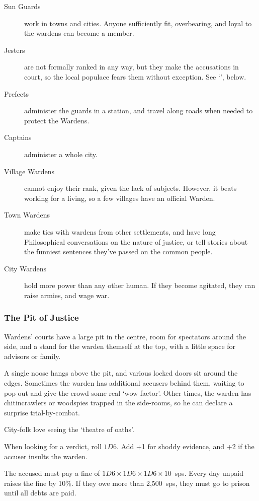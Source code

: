\begin{multicols}{2}
\begin{description}
  \item[Sun Guards]
  work in towns and cities.
  Anyone sufficiently fit, overbearing, and loyal to the wardens can become a member.
  \item[Jesters]
  are not formally ranked in any way, but they make the accusations in court, so the local populace fears them without exception.
  See `', below.
  \item[Prefects]
  administer the guards in a station, and travel along roads when needed to protect the Wardens.
  \item[Captains]
  administer a whole city.
  \item[Village Wardens]
  cannot enjoy their rank, given the lack of subjects.
  However, it beats working for a living, so a few \glspl{village} have an official Warden.
  \item[Town Wardens]
  make ties with wardens from other settlements, and have long Philosophical conversations on the nature of justice, or tell stories about the funniest sentences they've passed on the common people.
  \item[City Wardens]
  hold more power than any other human.
  If they become agitated, they can raise armies, and wage war.
\end{description}

\subsubsection{The Pit of Justice}

Wardens' courts have a large pit in the centre, room for spectators around the side, and a stand for the warden themself at the top, with a little space for advisors or family.

A single noose hangs above the pit, and various locked doors sit around the edges.
Sometimes the warden has additional accusers behind them, waiting to pop out and give the crowd some real `wow-factor'.
Other times, the warden has chitincrawlers or woodspies trapped in the side-rooms, so he can declare a surprise trial-by-combat.

City-folk love seeing the `theatre of oaths'.

When looking for a verdict, roll $1D6$.
Add +1 for shoddy evidence, and +2 if the accuser insults the warden.

\begin{dlist}
  \item
  The accused must pay a fine of $1D6\times 1D6\times 1D6\times 10$~\glspl{sp}.
  Every day unpaid raises the fine by 10\%.
  If they owe more than 2,500~\glspl{sp}, they must go to prison until all debts are paid.


\end{dlist}
\end{multicols}
